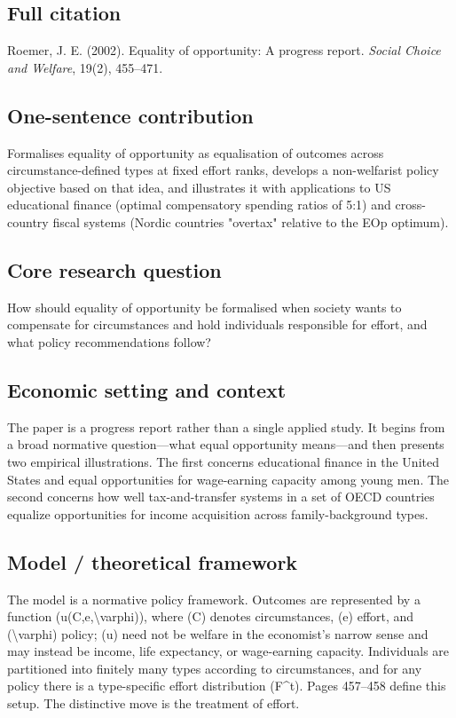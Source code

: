 \documentclass[11pt,a4paper]{article}
\begin{document}
\subsection*{Full citation}
Roemer, J. E. (2002). Equality of opportunity: A progress report. \textit{Social Choice and Welfare}, 19(2), 455--471.

\subsection*{One-sentence contribution}
Formalises equality of opportunity as equalisation of outcomes across circumstance-defined types at fixed effort ranks, develops a non-welfarist policy objective based on that idea, and illustrates it with applications to US educational finance (optimal compensatory spending ratios of 5:1) and cross-country fiscal systems (Nordic countries "overtax" relative to the EOp optimum).

\subsection*{Core research question}
How should equality of opportunity be formalised when society wants to compensate for circumstances and hold individuals responsible for effort, and what policy recommendations follow?

\subsection*{Economic setting and context}
The paper is a progress report rather than a single applied study. It begins from a broad normative question—what equal opportunity means—and then presents two empirical illustrations. The first concerns educational finance in the United States and equal opportunities for wage-earning capacity among young men. The second concerns how well tax-and-transfer systems in a set of OECD countries equalize opportunities for income acquisition across family-background types.

\subsection*{Model / theoretical framework}
The model is a normative policy framework. Outcomes are represented by a function (u(C,e,\textbackslash{}varphi)), where (C) denotes circumstances, (e) effort, and (\textbackslash{}varphi) policy; (u) need not be welfare in the economist’s narrow sense and may instead be income, life expectancy, or wage-earning capacity. Individuals are partitioned into finitely many types according to circumstances, and for any policy there is a type-specific effort distribution (F\textasciicircum{}t). Pages 457–458 define this setup. The distinctive move is the treatment of effort.
\end{document}
